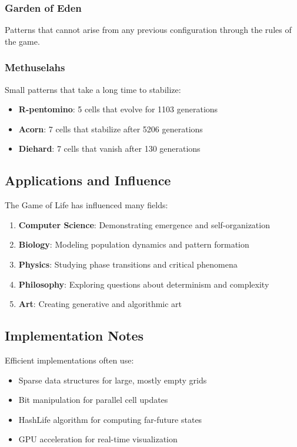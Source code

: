 \documentclass{article}
\begin{document}
\subsubsection{Garden of Eden}
Patterns that cannot arise from any previous configuration through the rules of the game.

\subsubsection{Methuselahs}
Small patterns that take a long time to stabilize:

\begin{itemize}
\item \textbf{R-pentomino}: 5 cells that evolve for 1103 generations
\item \textbf{Acorn}: 7 cells that stabilize after 5206 generations
\item \textbf{Diehard}: 7 cells that vanish after 130 generations
\end{itemize}

\subsection{Applications and Influence}

The Game of Life has influenced many fields:

\begin{enumerate}
\item \textbf{Computer Science}: Demonstrating emergence and self-organization
\item \textbf{Biology}: Modeling population dynamics and pattern formation
\item \textbf{Physics}: Studying phase transitions and critical phenomena
\item \textbf{Philosophy}: Exploring questions about determinism and complexity
\item \textbf{Art}: Creating generative and algorithmic art
\end{enumerate}

\subsection{Implementation Notes}

Efficient implementations often use:

\begin{itemize}
\item Sparse data structures for large, mostly empty grids
\item Bit manipulation for parallel cell updates
\item HashLife algorithm for computing far-future states
\item GPU acceleration for real-time visualization
\end{itemize}
\end{document}
